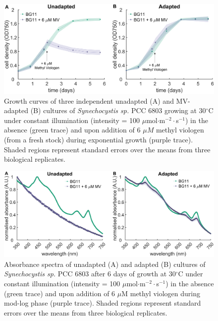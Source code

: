 \documentclass[12pt]{article}
\begin{document}
\begin{figure}[H]
    \centering
    \includegraphics[width=\hsize]{../Figures/MV_adaptation/growth_curves_firstevolution_Wt_6umMV.png}
    \caption{Growth curves of three independent unadapted (A) and MV-adapted (B) cultures of \textit{Synechocystis sp.} PCC 6803 growing at 30$^\circ$C under constant illumination (intensity = 100 $\mu$mol$\cdot$m$^{-2}\cdot$s$^{-1}$) in the absence (green trace) and upon addition of 6 $\mu M$  methyl viologen (from a fresh stock) during exponential growth (purple trace). Shaded regions represent standard errors over the means from three biological replicates.}
    \label{fig:freshstock}
\end{figure}


\begin{figure}[H]
    \centering
    \includegraphics[width=\hsize]{../Figures/MV_adaptation/spectra_endpoint_firstevolution_Wt_6umMV.png}
    \caption{Absorbance spectra of unadapted (A) and adapted (B) cultures of \textit{Synechocystis sp.} PCC 6803 after 6 days of growth at 30$^\circ$C under constant illumination (intensity = 100 $\mu$mol$\cdot$m$^{-2}\cdot$s$^{-1}$) in the absence (green trace) and upon addition  of 6 $\mu$M methyl viologen during mod-log phase (purple trace). Shaded regions represent standard errors over the means from three biological replicates.}
    \label{fig:spectraMV1}
\end{figure}
\end{document}
